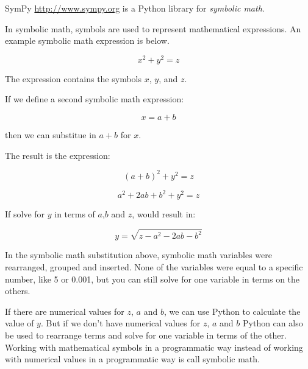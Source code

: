\documentclass{book}
\begin{document}
    
        SymPy \url{http://www.sympy.org} is a Python library for \emph{symbolic
math}.

In symbolic math, symbols are used to represent mathematical
expressions. An example symbolic math expression is below.
    




    
        \[ x^{2} + y^{2} = z \]
    




    
        The expression contains the symbols \(x\), \(y\), and \(z\).
    




    
        If we define a second symbolic math expression:
    




    
        \[ x = a + b \]
    




    
        then we can substitue in \(a + b\) for \(x\).
    




    
        The result is the expression:
    




    
        \[ (a + b)^{2} + y^{2} = z \]

\[ a^{2} + 2ab + b^{2} + y^{2} = z \]
    




    
        If solve for \(y\) in terms of \(a\),\(b\) and \(z\), would result in:

\[ y = \sqrt{z - a^{2} - 2ab - b^{2}} \]

In the symbolic math substitution above, symbolic math variables were
rearranged, grouped and inserted. None of the variables were equal to a
specific number, like 5 or 0.001, but you can still solve for one
variable in terms on the others.
    




    
        If there are numerical values for \(z\), \(a\) and \(b\), we can use
Python to calculate the value of \(y\). But if we don't have numerical
values for \(z\), \(a\) and \(b\) Python can also be used to rearrange
terms and solve for one variable in terms of the other. Working with
mathematical symbols in a programmatic way instead of working with
numerical values in a programmatic way is call symbolic math.
    
\end{document}
